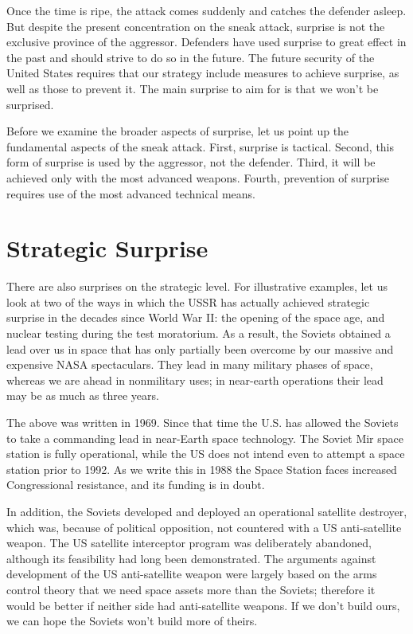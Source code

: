Once the time is ripe, the attack comes suddenly and catches the defender asleep. But despite the present concentration on the sneak attack, surprise is not the exclusive province of the aggressor. Defenders have used surprise to great effect in the past and should strive to do so in the future. The future security of the United States requires that our strategy include measures to achieve surprise, as well as those to prevent it. The main surprise to aim for is that we won't be surprised.

Before we examine the broader aspects of surprise, let us point up the fundamental aspects of the sneak attack. First, surprise is tactical. Second, this form of surprise is used by the aggressor, not the defender. Third, it will be achieved only with the most advanced weapons. Fourth, prevention of surprise requires use of the most advanced technical means.

\section{Strategic Surprise}
There are also surprises on the strategic level. For illustrative examples, let us look at two of the ways in which the USSR has actually achieved strategic surprise in the decades since World War II: the opening of the space age, and nuclear testing during the test moratorium. As a result, the Soviets obtained a lead over us in space that has only partially been overcome by our massive and expensive NASA spectaculars. They lead in many military phases of space, whereas we are ahead in nonmilitary uses; in near-earth operations their lead may be as much as three years.

\begin{mdframed}[backgroundcolor=black!10]
The above was written in 1969. Since that time the U.S. has allowed the Soviets to take a commanding lead in near-Earth space technology. The Soviet Mir space station is fully operational, while the US does not intend even to attempt a space station prior to 1992. As we write this in 1988 the Space Station faces increased Congressional resistance, and its funding is in doubt.

In addition, the Soviets developed and deployed an operational satellite destroyer, which was, because of political opposition, not countered with a US anti-satellite weapon. The US satellite interceptor program was deliberately abandoned, although its feasibility had long been demonstrated. The arguments against development of the US anti-satellite weapon were largely based on the arms control theory that we need space assets more than the Soviets; therefore it would be better if neither side had anti-satellite weapons. If we don't build ours, we can hope the Soviets won't build more of theirs.
\end{mdframed}


